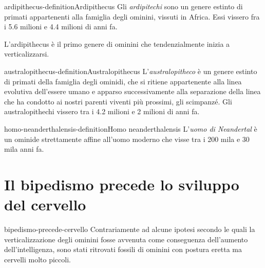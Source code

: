 \documentclass[preview]{standalone}
\begin{document}
\begin{snippetdefinition}{ardipithecus-definition}{Ardipithecus}
    Gli \textit{ardipitechi} sono un genere estinto di primati appartenenti alla famiglia degli ominini,
    vissuti in Africa.
    Essi vissero fra i 5.6 milioni e 4.4 milioni di anni fa.
\end{snippetdefinition}

\begin{plainhtml}
    L'ardipithecus è il primo genere di ominini che tendenzialmente inizia a verticalizzarsi.
\end{plainhtml}

\begin{snippetdefinition}{australopithecus-definition}{Australopithecus}
    L'\textit{australopitheco} è un genere estinto di primati della famiglia
    degli ominidi, che si ritiene appartenente alla linea
    evolutiva dell'essere umano e apparso successivamente alla separazione della
    linea che ha condotto ai nostri parenti viventi più prossimi, gli scimpanzé.
    Gli australopithechi vissero tra i 4.2 milioni e 2 milioni di anni fa.
\end{snippetdefinition}

\begin{snippetdefinition}{homo-neanderthalensis-definition}{Homo neanderthalensis}
    L'\textit{uomo di Neandertal} è un ominide strettamente affine all'uomo moderno
    che visse tra i 200 mila e 30 mila anni fa.
\end{snippetdefinition}


\section{Il bipedismo precede lo sviluppo del cervello}

\begin{snippet}{bipedismo-precede-cervello}
    Contrariamente ad alcune ipotesi secondo le quali la verticalizzazione degli
    ominini fosse avvenuta come conseguenza dell'aumento dell'intelligenza,
    sono stati ritrovati fossili di ominini con postura eretta ma cervelli molto piccoli.
\end{snippet}
\end{document}
